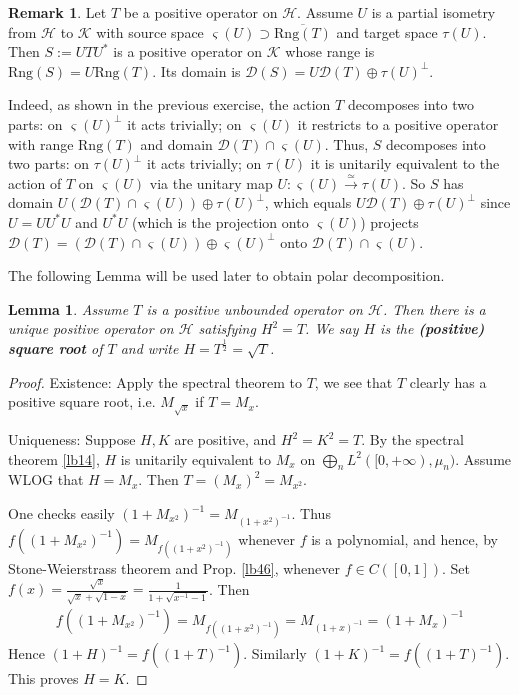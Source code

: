 \documentclass[12pt,b5paper,notitlepage]{article}
\theoremstyle{definition}
\newtheorem{rem}[df]{Remark}
\theoremstyle{plain}
\newtheorem{lm}[df]{Lemma}
\newcommand{\mc}{\mathcal}
\newcommand{\ovl}{\overline}
\newcommand{\Dom}{\scr D}
\newcommand{\scr}{\mathscr}
\newcommand{\sgm}{\varsigma}
\newcommand{\Rng}{\mathrm{Rng}}
\numberwithin{equation}{section}
\begin{document}
\begin{rem}\label{lb21}
Let $T$ be a positive operator on $\mc H$. Assume $U$ is a partial isometry from $\mc H$ to $\mc K$ with source space $\sgm(U)\supset\ovl{\Rng(T)}$ and target space $\tau(U)$. Then $S:=UTU^*$ is a positive operator on $\mc K$ whose range is $\Rng(S)=U\Rng(T)$. Its domain is $\Dom(S)=U\Dom(T)\oplus \tau(U)^\perp$. 

Indeed, as shown in the previous exercise, the action $T$ decomposes into two parts: on $\sgm(U)^\perp$ it acts trivially; on $\sgm(U)$ it restricts to a positive operator with range $\Rng(T)$ and domain $\Dom(T)\cap\sgm(U)$. Thus, $S$ decomposes into two parts: on $\tau(U)^\perp$ it acts trivially; on $\tau(U)$ it is unitarily equivalent to the action of $T$ on $\sgm(U)$ via the unitary map $U:\sgm(U)\xrightarrow{\simeq}\tau(U)$. So $S$ has domain $U(\Dom(T)\cap \sgm(U))\oplus \tau(U)^\perp$, which equals $U\Dom(T)\oplus \tau(U)^\perp$ since $U=UU^*U$ and $U^*U$ (which is the projection onto $\sgm(U)$) projects $\Dom(T)=(\Dom(T)\cap\sgm(U))\oplus \sgm(U)^\perp$ onto $\Dom(T)\cap\sgm(U)$.
\end{rem}







The following Lemma will be used later to obtain polar decomposition.

\begin{lm}\label{lb19}
Assume $T$ is a positive unbounded operator on $\mc H$. Then there is a unique positive operator on $\mc H$ satisfying $H^2=T$. We say $H$ is the \textbf{(positive) square root} of $T$ and write $H=T^{\frac 12}=\sqrt T$. 
\end{lm}

\begin{proof}
Existence: Apply the spectral theorem to $T$, we see that $T$ clearly has a positive square root, i.e. $M_{\sqrt x}$ if $T=M_x$.
	
Uniqueness: Suppose $H,K$ are positive, and $H^2=K^2=T$. By the spectral theorem \ref{lb14}, $H$ is unitarily equivalent to $M_x$ on $\bigoplus_n L^2([0,+\infty),\mu_n)$. Assume WLOG that $H=M_x$. Then $T=(M_x)^2=M_{x^2}$. 

One checks easily $(1+M_{x^2})^{-1}=M_{(1+x^2)^{-1}}$. Thus $f((1+M_{x^2})^{-1})=M_{f((1+x^2)^{-1})}$ whenever $f$ is a polynomial, and hence, by Stone-Weierstrass theorem and Prop. \ref{lb46}, whenever $f\in C([0,1])$.  Set $f(x)=\frac{\sqrt x}{\sqrt x+\sqrt{1-x}}=\frac{1}{1+\sqrt{x^{-1}-1}}$. Then
\begin{align*}
f((1+M_{x^2})^{-1})=M_{f((1+x^2)^{-1})}=M_{(1+x)^{-1}}=(1+M_x)^{-1}
\end{align*}
Hence $(1+H)^{-1}=f((1+T)^{-1})$. Similarly $(1+K)^{-1}=f((1+T)^{-1})$. This proves $H=K$.
\end{proof}
\end{document}
